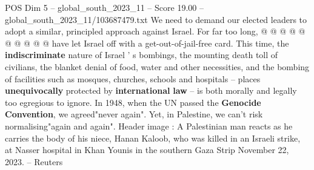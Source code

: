 \begin{textsample}{POS Dim 5 – global\_south\_2023\_11 – Score 19.00 – global\_south\_2023\_11/103687479.txt}
We need to demand our elected leaders to adopt a similar, principled approach against Israel.
For far too long, @ @ @ @ @ @ @ @ @ @ have let Israel off with a get-out-of-jail-free card.
This time, the \textbf{indiscriminate} nature of Israel ' s bombings, the mounting death toll of civilians, the blanket denial of food, water and other necessities, and the bombing of facilities such as mosques, churches, schools and hospitals -- places \textbf{unequivocally} protected by \textbf{international} \textbf{law} -- is both morally and legally too egregious to ignore.
In 1948, when the UN passed the \textbf{Genocide} \textbf{Convention}, we agreed"never again".
Yet, in Palestine, we can't risk normalising"again and again".
Header image : A Palestinian man reacts as he carries the body of his niece, Hanan Kaloob, who was killed in an Israeli strike, at Nasser hospital in Khan Younis in the southern Gaza Strip November 22, 2023. -- Reuters

\end{textsample}
